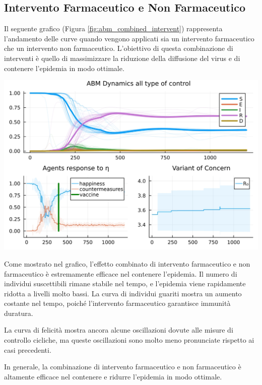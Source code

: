 \subsection{Intervento Farmaceutico e Non Farmaceutico}

Il seguente grafico (Figura \ref{fig:abm_combined_intervent}) 
rappresenta l'andamento delle curve quando vengono applicati sia 
un intervento farmaceutico che un intervento non farmaceutico. 
L'obiettivo di questa combinazione di interventi è quello di 
massimizzare la riduzione della diffusione del virus e di contenere 
l'epidemia in modo ottimale.

\begin{minipage}{\linewidth}
    \centering
    \includegraphics[width=\textwidth]{img/SocialNetworkABM_ALL.jpg}
    \label{fig:abm_combined_intervent}
\end{minipage}

Come mostrato nel grafico, l'effetto combinato di intervento 
farmaceutico e non farmaceutico è estremamente efficace nel 
contenere l'epidemia. Il numero di individui suscettibili 
rimane stabile nel tempo, e l'epidemia viene rapidamente ridotta 
a livelli molto bassi. La curva di individui guariti mostra un 
aumento costante nel tempo, poiché l'intervento farmaceutico 
garantisce immunità duratura.

La curva di felicità mostra ancora alcune oscillazioni dovute 
alle misure di controllo cicliche, ma queste oscillazioni sono 
molto meno pronunciate rispetto ai casi precedenti.

In generale, la combinazione di intervento farmaceutico e non 
farmaceutico è altamente efficace nel contenere e ridurre 
l'epidemia in modo ottimale.
\newpage

